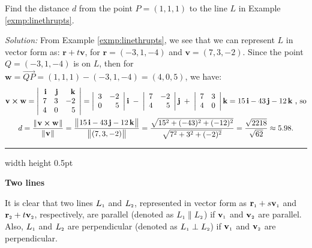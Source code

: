\begin{exmp}
 Find the distance $d$ from the point $P = (1,1,1)$ to the line $L$ in Example \ref{exmp:linethrupts}.\smallskip
 \par\noindent\emph{Solution:} 
 From Example \ref{exmp:linethrupts}, we see that we can represent $L$ in vector form as:
 $\mathbf{r} + t \mathbf{v}$, for $\mathbf{r} = (-3,1,-4)$ and $\mathbf{v} = (7,3,-2)$. 
 Since the point $Q = (-3,1,-4)$
 is on $L$, then for $\mathbf{w} = \overrightarrow{QP} = (1,1,1) - (-3,1,-4) = (4,0,5)$, we have:
 \begin{gather*}
  \mathbf{v} \bm{\times} \mathbf{w} = \left|\begin{array}{rrr}\mathbf{i} & \mathbf{j} & \mathbf{k}\\7 & 3 & -2\\
   4 & 0 & 5\end{array}\right|
   = \left|\begin{array}{rr}3 & -2\\0 & 5\end{array}\right| \mathbf{i} \;-\;
     \left|\begin{array}{rr}7 & -2\\4 & 5\end{array}\right| \mathbf{j} \;+\;
     \left|\begin{array}{rr}7 & 3\\4 & 0\end{array}\right| \mathbf{k}
   = 15\,\mathbf{i} - 43\,\mathbf{j} - 12\,\mathbf{k} \text{~,~so}\\
  d = \frac{\lVert\mspace{1mu}\mathbf{v} \bm{\times} \mathbf{w}\mspace{1mu}\rVert}{\lVert\mspace{1mu}\mathbf{v}\mspace{1mu}\rVert} =
   \frac{\bigl\lVert\mspace{1mu}15\,\mathbf{i} - 43\,\mathbf{j} - 12\,\mathbf{k}\mspace{1mu}\bigr\rVert}{\bigl\lVert\mspace{1mu}(7,3,-2)\mspace{1mu}\bigr\rVert}
  = \frac{\sqrt{15^2 + (-43)^2 + (-12)^2}}{\sqrt{7^2 + 3^2 + (-2)^2}}
  = \frac{\sqrt{2218}}{\sqrt{62}} \approx 5.98.
 \end{gather*}
\end{exmp}
\hrule width \textwidth height 0.5pt
\medskip
\par\noindent\textbf{\large{Two lines}}\normalsize
\smallskip

It is clear that two lines $L_{\scriptscriptstyle 1}$ and $L_{\scriptscriptstyle 2}$, represented in vector form as
$\mathbf{r}_{\scriptscriptstyle 1} + s \mathbf{v}_{\scriptscriptstyle 1}$ and $\mathbf{r}_{\scriptscriptstyle 2} + t \mathbf{v}_{\scriptscriptstyle 2}$, respectively, are
parallel (denoted as $L_{\scriptscriptstyle 1} \parallel L_{\scriptscriptstyle 2}$) if $\mathbf{v}_{\scriptscriptstyle 1}$ and $\mathbf{v}_{\scriptscriptstyle 2}$ are
parallel. 
Also, $L_{\scriptscriptstyle 1}$ and $L_{\scriptscriptstyle 2}$ are perpendicular (denoted as $L_{\scriptscriptstyle 1} \perp L_{\scriptscriptstyle 2}$) if
$\mathbf{v}_{\scriptscriptstyle 1}$ and $\mathbf{v}_{\scriptscriptstyle 2}$ are perpendicular.

